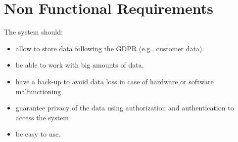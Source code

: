 \section{Non Functional Requirements}
The system should:
\begin{itemize}
    \item allow to store data following the GDPR (e.g., customer data).
    \item be able to work with big amounts of data.
    \item have a back-up to avoid data loss in case of hardware or software malfunctioning
    \item guarantee privacy of the data using authorization and authentication to access the system
    \item be easy to use.
\end{itemize}

